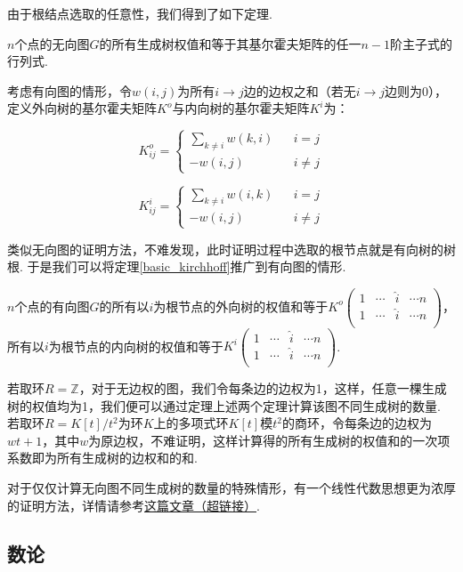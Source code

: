 由于根结点选取的任意性，我们得到了如下定理.

\begin{theorem}[无向图的矩阵树定理]
	$n$个点的无向图$G$的所有生成树权值和等于其基尔霍夫矩阵的任一$n-1$阶主子式的行列式.
	\label{basic_kirchhoff}
\end{theorem}

考虑有向图的情形，令$w(i,j)$为所有$i\to j$边的边权之和（若无$i\to j$边则为0），定义外向树的基尔霍夫矩阵$K^o$与内向树的基尔霍夫矩阵$K^i$为：

$$
K^o_{ij}=\left\{
\begin{array}{rcl}
	\sum\limits_{k\neq i}w(k,i) & & i=j\\
	-w(i,j) & & {i\neq j}
\end{array} \right.
$$

$$
K^i_{ij}=\left\{
\begin{array}{rcl}
	\sum\limits_{k\neq i}w(i,k) & & i=j\\
	-w(i,j) & & {i\neq j}
\end{array} \right.
$$

类似无向图的证明方法，不难发现，此时证明过程中选取的根节点就是有向树的树根. 于是我们可以将定理\ref{basic_kirchhoff}推广到有向图的情形.

\begin{theorem}
	$n$个点的有向图$G$的所有以$i$为根节点的外向树的权值和等于$K^o
	\begin{pmatrix}
		1 & \cdots & \hat{i} & \cdots n\\
		1 & \cdots & \hat{i} & \cdots n\\
	\end{pmatrix}$，所有以$i$为根节点的内向树的权值和等于$K^i
	\begin{pmatrix}
	1 & \cdots & \hat{i} & \cdots n\\
	1 & \cdots & \hat{i} & \cdots n\\
	\end{pmatrix}$.
\end{theorem}

若取环$R=\mathbb{Z}$，对于无边权的图，我们令每条边的边权为1，这样，任意一棵生成树的权值均为1，我们便可以通过定理上述两个定理计算该图不同生成树的数量. 若取环$R=K[t]/t^2$为环$K$上的多项式环$K[t]$模$t^2$的商环，令每条边的边权为$wt+1$，其中$w$为原边权，不难证明，这样计算得的所有生成树的权值和的一次项系数即为所有生成树的边权和的和.

\begin{remark}
	对于仅仅计算无向图不同生成树的数量的特殊情形，有一个线性代数思想更为浓厚的证明方法，详情请参考\href{https://zhuanlan.zhihu.com/p/108209378}{这篇文章（超链接）}.
\end{remark}

\subsection{数论}
